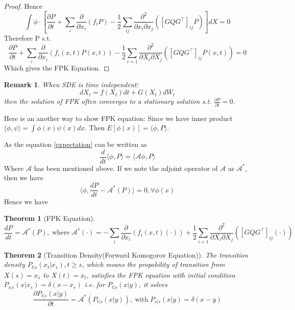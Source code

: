 \documentclass{article}
\newtheorem{theorem}{Theorem}
\newtheorem{remark}{Remark}
\begin{document}
\begin{proof}
    Hence $$\int \phi \cdot\left[\frac{\partial P}{\partial t}+\sum_{i} \frac{\partial}{\partial x_{i}}\left(f_{i} P\right)-\frac{1}{2} \sum_{i j} \frac{\partial^{2}}{\partial x_{i} \partial x_{j}}\left(\left[G Q G^{\top}\right]_{i j} P\right)\right] d X=0$$
    Therefore P s.t.    
    \begin{equation}
        \frac{\partial P}{\partial t}+\sum_{i} \frac{\partial}{\partial x_{i}}\left(f_{i}(x, t) P(x, t)\right)-\frac{1}{2} \sum_{i=1} \frac{\partial^{2}}{\partial X_{i} \partial X_{j}}\left(\left[G Q G^{\top}\right]_{i j} P\left(x,t\right)\right)=0
    \end{equation}
    Which gives the FPK Equation.
\end{proof}

\begin{remark}
    When SDE is time independent:  
    \begin{equation}
        d X_t=f(X_t) d t+G(X_t) d W_{t}  
    \end{equation}
    then the solution of FPK often converges to a stationary solution s.t.  $\frac{\partial P}{\partial t}=0$.
\end{remark}
Here is an another way to show FPK equation: Since we have inner product $\langle\phi, \psi\rangle=\int \phi(x)\psi(x)dx$. Then $E[\phi(x)]=\langle\phi, P\rangle$.

As the equation \ref{expectation} can be written as 
\begin{equation}
    \frac{d}{dt}\langle\phi, P\rangle=\langle\mathcal{A}\phi, P\rangle
\end{equation}
Where $\mathcal{A}$ has been mentioned above. If we note the adjoint operator of $\mathcal{A}$ as $\mathcal{A}^*$, then we have
\begin{equation}
    \langle\phi, \frac{dP}{dt}-\mathcal{A}^*(P)\rangle=0,\forall \phi(x)
\end{equation}
Hence we have 
\begin{theorem}[FPK Equation]
    \begin{equation}
    \frac{dP}{dt}=\mathcal{A}^*(P),\operatorname{where} \mathcal{A}^*(\cdot)=-\sum_{i} \frac{\partial}{\partial x_{i}}\left(f_{i}(x, t) (\cdot)\right)+\frac{1}{2} \sum_{i=1} \frac{\partial^{2}}{\partial X_{i} \partial X_{j}}\left(\left[G Q G^{\top}\right]_{i j}(\cdot)\right)
\end{equation}
\end{theorem}

\begin{theorem}[Transition Density(Forward Komogorov Equation)]
     The transition density $P_{t|s}(x_t|x_s),t\geq s$, which means the propability of transition from $X(s)=x_s$ to $X(t)=x_t$, satisfies the FPK equation with initial condition $P_{s|s}(x|x_s)=\delta(x-x_s)$
     i.e. for $P_{t|s}(x|y)$, it solves
     \begin{equation}
        \frac{\partial P_{t|s}(x|y)}{\partial t}=\mathcal{A}^*(P_{t|s}(x|y)), \operatorname{with} P_{s|s}(x|y)=\delta(x-y)
     \end{equation}
\end{theorem}
\end{document}
